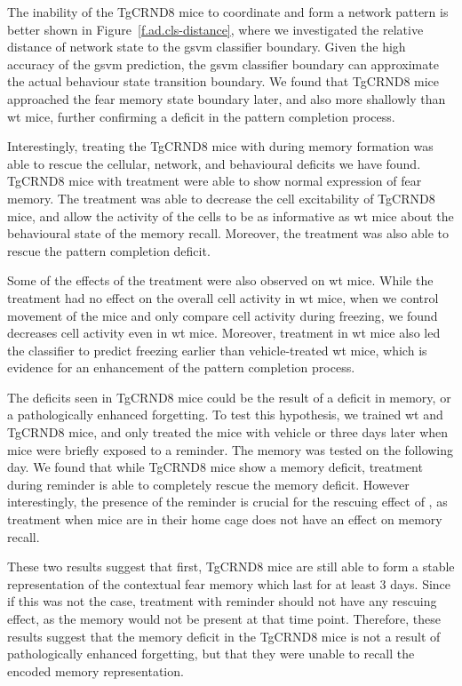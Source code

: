 The inability of the TgCRND8 mice to coordinate and form a network pattern is better shown in Figure~\ref{f.ad.cls-distance}, where we investigated the relative distance of network state to the \gls{gsvm} classifier boundary. Given the high accuracy of the \gls{gsvm} prediction, the \gls{gsvm} classifier boundary can approximate the actual behaviour state transition boundary. We found that TgCRND8 mice approached the fear memory state boundary later, and also more shallowly than \gls{wt} mice, further confirming a deficit in the pattern completion process. 

Interestingly, treating the TgCRND8 mice with \tglu{} during memory formation was able to rescue the cellular, network, and behavioural deficits we have found. TgCRND8 mice with \tglu{} treatment were able to show normal expression of fear memory. The \tglu{} treatment was able to decrease the cell excitability of TgCRND8 mice, and allow the activity of the cells to be as informative as \gls{wt} mice about the behavioural state of the memory recall. Moreover, the \tglu{} treatment was also able to rescue the pattern completion deficit. 

Some of the effects of the \tglu{} treatment were also observed on \gls{wt} mice. While the \tglu{} treatment had no effect on the overall cell activity in \gls{wt} mice, when we control movement of the mice and only compare cell activity during freezing, we found \tglu{} decreases cell activity even in \gls{wt} mice. Moreover, \tglu{} treatment in \gls{wt} mice also led the classifier to predict freezing earlier than vehicle-treated \gls{wt} mice, which is evidence for an enhancement of the pattern completion process. 

The deficits seen in TgCRND8 mice could be the result of a deficit in memory, or a pathologically enhanced forgetting. To test this hypothesis, we trained \gls{wt} and TgCRND8 mice, and only treated the mice with vehicle or \tglu{} three days later when mice were briefly exposed to a reminder. The memory was tested on the following day. We found that while TgCRND8 mice show a memory deficit, \tglu{} treatment during reminder is able to completely rescue the memory deficit. However interestingly, the presence of the reminder is crucial for the rescuing effect of \tglu, as \tglu{} treatment when mice are in their home cage does not have an effect on memory recall. 

These two results suggest that first, TgCRND8 mice are still able to form a stable representation of the contextual fear memory which last for at least 3 days. Since if this was not the case, \tglu{} treatment with reminder should not have any rescuing effect, as the memory would not be present at that time point. Therefore, these results suggest that the memory deficit in the TgCRND8 mice is not a result of pathologically enhanced forgetting, but that they were unable to recall the encoded memory representation.

